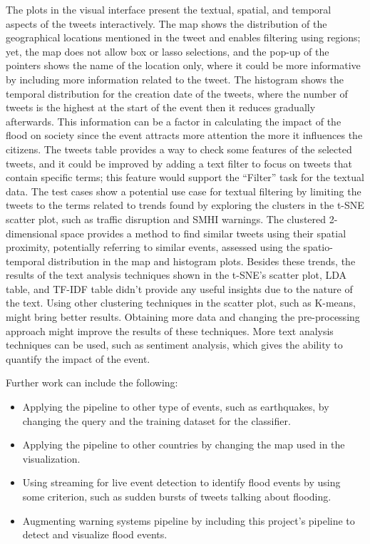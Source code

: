 The plots in the visual interface present the textual, spatial, and temporal aspects of the tweets
interactively. The map shows the distribution of the geographical locations mentioned in the tweet
and enables filtering using regions; yet, the map does not allow box or lasso selections, and the
pop-up of the pointers shows the name of the location only, where it could be more informative by
including more information related to the tweet. The histogram shows the temporal distribution for
the creation date of the tweets, where the number of tweets is the highest at the start of the event
then it reduces gradually afterwards. This information can be a factor in calculating the impact of
the flood on society since the event attracts more attention the more it influences the citizens.
The tweets table provides a way to check some features of the selected tweets, and it could be
improved by adding a text filter to focus on tweets that contain specific terms; this feature would
support the ``Filter'' task for the textual data. The test cases show a potential use case for
textual filtering by limiting the tweets to the terms related to trends found by exploring the
clusters in the \ac{t-SNE} scatter plot, such as traffic disruption and \ac{SMHI} warnings. The
clustered 2-dimensional space provides a method to find similar tweets using their spatial
proximity, potentially referring to similar events, assessed using the spatio-temporal
distribution in the map and histogram plots. Besides these trends, the results of the text analysis
techniques shown in the \ac{t-SNE}'s scatter plot, \ac{LDA} table, and \ac{TF-IDF} table didn't
provide any useful insights due to the nature of the text. Using other clustering techniques in the
scatter plot, such as K-means, might bring better results. Obtaining more data and changing the
pre-processing approach might improve the results of these techniques. More text analysis techniques
can be used, such as sentiment analysis, which gives the ability to quantify the impact of the
event.

Further work can include the following:
\begin{itemize}
  \item Applying the pipeline to other type of events, such as earthquakes, by changing the query
    and the training dataset for the classifier.
  \item Applying the pipeline to other countries by changing the map used in the visualization.
  \item Using streaming for live event detection to identify flood events by using some criterion,
    such as sudden bursts of tweets talking about flooding.
  \item Augmenting warning systems pipeline by including this project's pipeline to detect and visualize flood events.
\end{itemize}

